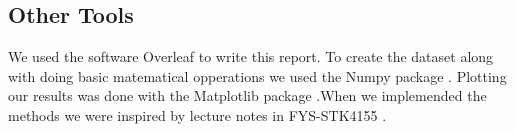 \subsection{Other Tools}

We used the software Overleaf to write this report. To create the dataset along with doing basic matematical opperations we used the Numpy package \cite{harris2020numpy}. Plotting our results was done with the Matplotlib package \cite{hunter-2007matplotlib}.When we implemended the methods we were inspired by lecture notes in FYS-STK4155 \cite{Hjorth-Jensen_MachineLearning_2023}. 









